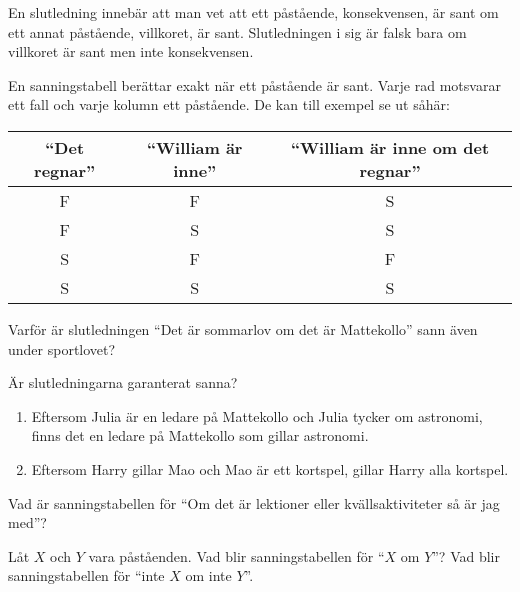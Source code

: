 \begin{definition}[Slutledning]
	En slutledning innebär att man vet att ett påstående, konsekvensen, är sant om ett annat påstående, villkoret, är sant. Slutledningen i sig är falsk bara om villkoret är sant men inte konsekvensen.
\end{definition}

\begin{definition}[Sanningstabell] %
	En sanningstabell berättar exakt när ett påstående är sant. Varje rad motsvarar ett fall och varje kolumn ett påstående. De kan till exempel se ut såhär:
	\begin{center}
		\begin{tabular}{|c|c|c|}
			\hline
			``Det regnar'' & ``William är inne'' & ``William är inne om det regnar'' \\ \hline
			F & F & S \\ \hline
			F & S & S \\ \hline
			S & F & F \\ \hline
			S & S & S \\ \hline
		\end{tabular}
	\end{center}
\end{definition}

\begin{problem}
	Varför är slutledningen ``Det är sommarlov om det är Mattekollo'' sann även under sportlovet?
\end{problem}

\begin{problem}
	Är slutledningarna garanterat sanna?
	\begin{enumerate}[label=\alph*)]
		\item Eftersom Julia är en ledare på Mattekollo och Julia tycker om astronomi, finns det en ledare på Mattekollo som gillar astronomi.
		\item Eftersom Harry gillar Mao och Mao är ett kortspel, gillar Harry alla kortspel.
	\end{enumerate}
\end{problem}

\begin{problem}
	Vad är sanningstabellen för ``Om det är lektioner eller kvällsaktiviteter så är jag med''?
\end{problem}

\begin{problem}%
	Låt \(X\) och \(Y\) vara påståenden. Vad blir sanningstabellen för ``\(X\) om \(Y\)''? Vad blir sanningstabellen för ``inte \(X\) om inte \(Y\)''.
\end{problem}

